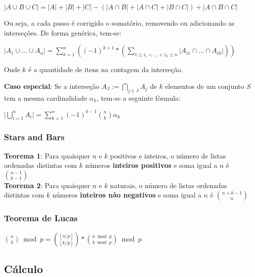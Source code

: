 $|A \cup B \cup C| = |A| + |B| + |C| - (|A \cap B| + |A \cap C| + |B \cap C|) + |A \cap B \cap C|$

Ou seja, a cada passo \'{e} corrigido o somat\'{o}rio, removendo ou adicionando as interse\c{c}\~{o}es. De forma gen\'{e}rica, tem-se:

$|A_1 \cup ... \cup A_n| = \sum_{k=1}^{n} ((-1)^{k+1}*(\sum_{1 \leq i_1 < ... < i_k \leq n} |A_{i1} \cap ... \cap A_{ik}|))$

Onde $k$ \'{e} a quantidade de itens na contagem da interse\c{c}\~{a}o.

\textbf{Caso especial}: Se a interseção $A_J:=\bigcap_{j\in J} A_j$ de $k$ elementos de um conjunto $S$ tem a mesma cardinalidade $\alpha_k$, tem-se a seguinte fórmula:

$\biggl| \bigcup_{i=1}^n A_i\biggr| = \sum_{k=1}^n (-1)^{k-1} {n \choose k} \alpha_k$

\divisor

\subsubsection{Stars and Bars}
\textbf{Teorema 1}: Para quaisquer $n$ e $k$ positivos e inteiros, o n\'{u}mero de listas ordenadas distintas com $k$ n\'{u}meros \textbf{inteiros positivos} e soma igual a $n$ \'{e} ${n-1 \choose k-1}$ \\

\textbf{Teorema 2}: Para quaisquer $n$ e $k$ naturais, o n\'{u}mero de listas ordenadas distintas com $k$ n\'{u}meros \textbf{inteiros n\~{a}o negativos} e soma igual a $n$ \'{e} ${n+k-1 \choose n}$

\divisor

\subsubsection{Teorema de Lucas}

${n \choose k} \bmod{p} = {\left \lfloor{n/p}\right \rfloor \choose \left \lfloor{k/p}\right \rfloor} * {n \bmod{p} \choose k \bmod{p}} \bmod{p}$




\subsection{Cálculo}

